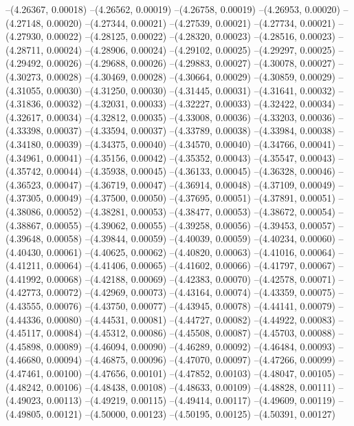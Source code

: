 --(4.26367, 0.00018)
--(4.26562, 0.00019)
--(4.26758, 0.00019)
--(4.26953, 0.00020)
--(4.27148, 0.00020)
--(4.27344, 0.00021)
--(4.27539, 0.00021)
--(4.27734, 0.00021)
--(4.27930, 0.00022)
--(4.28125, 0.00022)
--(4.28320, 0.00023)
--(4.28516, 0.00023)
--(4.28711, 0.00024)
--(4.28906, 0.00024)
--(4.29102, 0.00025)
--(4.29297, 0.00025)
--(4.29492, 0.00026)
--(4.29688, 0.00026)
--(4.29883, 0.00027)
--(4.30078, 0.00027)
--(4.30273, 0.00028)
--(4.30469, 0.00028)
--(4.30664, 0.00029)
--(4.30859, 0.00029)
--(4.31055, 0.00030)
--(4.31250, 0.00030)
--(4.31445, 0.00031)
--(4.31641, 0.00032)
--(4.31836, 0.00032)
--(4.32031, 0.00033)
--(4.32227, 0.00033)
--(4.32422, 0.00034)
--(4.32617, 0.00034)
--(4.32812, 0.00035)
--(4.33008, 0.00036)
--(4.33203, 0.00036)
--(4.33398, 0.00037)
--(4.33594, 0.00037)
--(4.33789, 0.00038)
--(4.33984, 0.00038)
--(4.34180, 0.00039)
--(4.34375, 0.00040)
--(4.34570, 0.00040)
--(4.34766, 0.00041)
--(4.34961, 0.00041)
--(4.35156, 0.00042)
--(4.35352, 0.00043)
--(4.35547, 0.00043)
--(4.35742, 0.00044)
--(4.35938, 0.00045)
--(4.36133, 0.00045)
--(4.36328, 0.00046)
--(4.36523, 0.00047)
--(4.36719, 0.00047)
--(4.36914, 0.00048)
--(4.37109, 0.00049)
--(4.37305, 0.00049)
--(4.37500, 0.00050)
--(4.37695, 0.00051)
--(4.37891, 0.00051)
--(4.38086, 0.00052)
--(4.38281, 0.00053)
--(4.38477, 0.00053)
--(4.38672, 0.00054)
--(4.38867, 0.00055)
--(4.39062, 0.00055)
--(4.39258, 0.00056)
--(4.39453, 0.00057)
--(4.39648, 0.00058)
--(4.39844, 0.00059)
--(4.40039, 0.00059)
--(4.40234, 0.00060)
--(4.40430, 0.00061)
--(4.40625, 0.00062)
--(4.40820, 0.00063)
--(4.41016, 0.00064)
--(4.41211, 0.00064)
--(4.41406, 0.00065)
--(4.41602, 0.00066)
--(4.41797, 0.00067)
--(4.41992, 0.00068)
--(4.42188, 0.00069)
--(4.42383, 0.00070)
--(4.42578, 0.00071)
--(4.42773, 0.00072)
--(4.42969, 0.00073)
--(4.43164, 0.00074)
--(4.43359, 0.00075)
--(4.43555, 0.00076)
--(4.43750, 0.00077)
--(4.43945, 0.00078)
--(4.44141, 0.00079)
--(4.44336, 0.00080)
--(4.44531, 0.00081)
--(4.44727, 0.00082)
--(4.44922, 0.00083)
--(4.45117, 0.00084)
--(4.45312, 0.00086)
--(4.45508, 0.00087)
--(4.45703, 0.00088)
--(4.45898, 0.00089)
--(4.46094, 0.00090)
--(4.46289, 0.00092)
--(4.46484, 0.00093)
--(4.46680, 0.00094)
--(4.46875, 0.00096)
--(4.47070, 0.00097)
--(4.47266, 0.00099)
--(4.47461, 0.00100)
--(4.47656, 0.00101)
--(4.47852, 0.00103)
--(4.48047, 0.00105)
--(4.48242, 0.00106)
--(4.48438, 0.00108)
--(4.48633, 0.00109)
--(4.48828, 0.00111)
--(4.49023, 0.00113)
--(4.49219, 0.00115)
--(4.49414, 0.00117)
--(4.49609, 0.00119)
--(4.49805, 0.00121)
--(4.50000, 0.00123)
--(4.50195, 0.00125)
--(4.50391, 0.00127)
